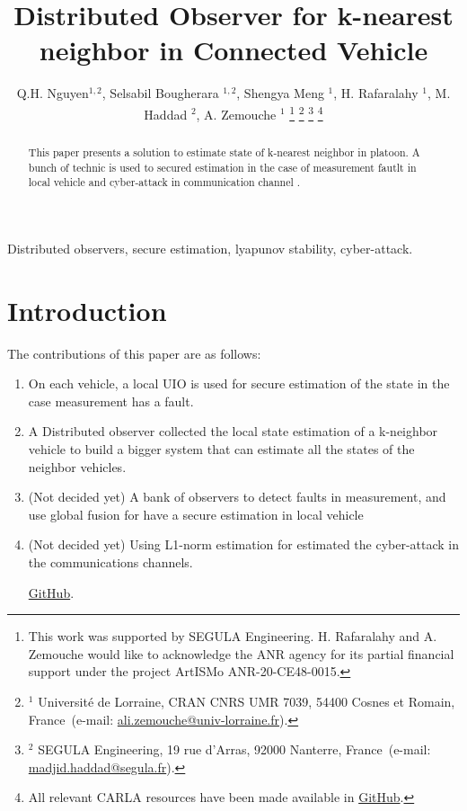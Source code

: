\documentclass[letterpaper, 10pt, conference]{ieeeconf}  %
\begin{document}
\title{\bf Distributed Observer for k-nearest neighbor in Connected Vehicle }
\author{Q.H. Nguyen$^{1,2}$, Selsabil Bougherara $^{1,2}$, Shengya Meng $^{1}$, H. Rafaralahy $^{1}$, M. Haddad $^{2}$, A. Zemouche $^{1}$
%
\thanks{This work was supported by SEGULA Engineering. H. Rafaralahy and A. Zemouche would like to acknowledge the ANR agency for its partial financial support under the project ArtISMo ANR-20-CE48-0015.
}
%
\thanks{$^{1}$ Universit\'e de Lorraine, CRAN  CNRS UMR 7039, 54400 Cosnes et Romain, France~(e-mail: \protect\url{ali.zemouche@univ-lorraine.fr}).}
%
\thanks{$^{2}$ SEGULA Engineering, 19 rue d'Arras, 92000 Nanterre, France~(e-mail: \protect\url{madjid.haddad@segula.fr}).}
%
\thanks{All relevant CARLA resources have been made available in \protect\href{https://github.com/kslhuy/CACC_UIO_simulink}{GitHub}.}
}
\maketitle

\begin{abstract}
This paper presents a solution to estimate state of k-nearest neighbor in platoon. A bunch of technic is used to secured estimation in the case of measurement fautlt in local vehicle and cyber-attack in communication channel .
\end{abstract}

\begin{keywords}
Distributed observers, secure estimation, lyapunov stability, cyber-attack.
\end{keywords}

\section{Introduction}
    

The contributions of this paper are as follows:
\begin{enumerate}
\item On each vehicle, a local UIO is used for secure estimation of the state in the case measurement has a fault. 
\item A Distributed observer collected the local state estimation of a k-neighbor vehicle to build a bigger system that can estimate all the states of the neighbor vehicles.
\item (Not decided yet) A bank of observers to detect faults in measurement, and use global fusion for have a secure estimation in local vehicle 
\item (Not decided yet) Using L1-norm estimation for estimated the cyber-attack in the communications channels.

\protect\href{https://github.com/kslhuy/CACC_UIO_simulink}{GitHub}.
\end{enumerate}
\end{document}
